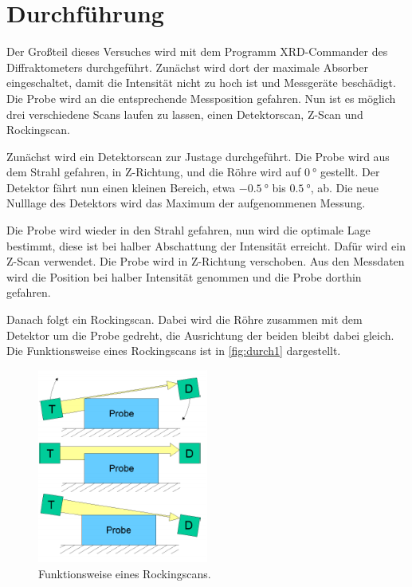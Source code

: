 \section{Durchführung}
\label{sec:Durchführung}

Der Großteil dieses Versuches wird mit dem Programm XRD-Commander des Diffraktometers durchgeführt.
Zunächst wird dort der maximale Absorber eingeschaltet, damit die Intensität nicht zu hoch ist und Messgeräte beschädigt.
Die Probe wird an die entsprechende Messposition gefahren.
Nun ist es möglich drei verschiedene Scans laufen zu lassen, einen Detektorscan, Z-Scan und Rockingscan.

Zunächst wird ein Detektorscan zur Justage durchgeführt.
Die Probe wird aus dem Strahl gefahren, in Z-Richtung, und die Röhre wird auf $\SI{0}{\degree}$ gestellt.
Der Detektor fährt nun einen kleinen Bereich, etwa $\SI{-0.5}{\degree}$ bis $\SI{0.5}{\degree}$, ab.
Die neue Nulllage des Detektors wird das Maximum der aufgenommenen Messung.

Die Probe wird wieder in den Strahl gefahren, nun wird die optimale Lage bestimmt, diese ist bei halber Abschattung der Intensität erreicht.
Dafür wird ein Z-Scan verwendet. 
Die Probe wird in Z-Richtung verschoben.
Aus den Messdaten wird die Position bei halber Intensität genommen und die Probe dorthin gefahren.

Danach folgt ein Rockingscan. 
Dabei wird die Röhre zusammen mit dem Detektor um die Probe gedreht, die Ausrichtung der beiden bleibt dabei gleich.
Die Funktionsweise eines Rockingscans ist in \autoref{fig:durch1} dargestellt.

\begin{figure}
    \centering
    \includegraphics[width=0.5\textwidth]{images/rocking.png}
    \caption{Funktionsweise eines Rockingscans. \cite{V44}}
    \label{fig:durch1}
\end{figure}

